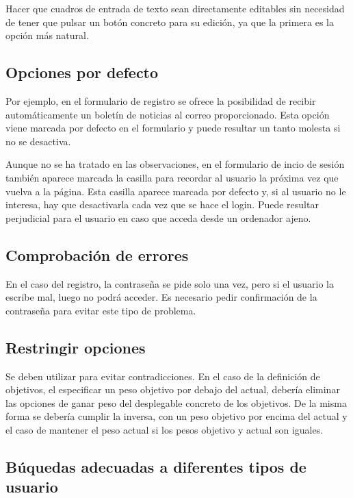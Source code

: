 \documentclass[a4paper]{article}
\begin{document}
	Hacer que cuadros de entrada de texto sean directamente editables sin necesidad de tener que pulsar un botón concreto para su edición, ya que la primera es la opción más natural.
	
	\subsection{Opciones por defecto}
	
	Por ejemplo, en el formulario de registro se ofrece la posibilidad de recibir automáticamente un boletín de noticias al correo proporcionado. Esta opción viene marcada por defecto en el formulario y puede resultar un tanto molesta si no se desactiva.
	
	Aunque no se ha tratado en las observaciones, en el formulario de incio de sesión también aparece marcada la casilla para recordar al usuario la próxima vez que vuelva a la página. Esta casilla aparece marcada por defecto y, si al usuario no le interesa, hay que desactivarla cada vez que se hace el login. Puede resultar perjudicial para el usuario en caso que acceda desde un ordenador ajeno.
	
	\subsection{Comprobación de errores}
	
	En el caso del registro, la contraseña se pide solo una vez, pero si el usuario la escribe mal, luego no podrá acceder. Es necesario pedir confirmación de la contraseña para evitar este tipo de problema.
	
	\subsection{Restringir opciones}
	
	Se deben utilizar para evitar contradicciones. En el caso de la definición de objetivos, el especificar un peso objetivo por debajo del actual, debería eliminar las opciones de ganar peso del desplegable concreto de los objetivos. De la misma forma se debería cumplir la inversa, con un peso objetivo por encima del actual y el caso de mantener el peso actual si los pesos objetivo y actual son iguales.
	
	\subsection{Búquedas adecuadas a diferentes tipos de usuario}
	
\end{document}
